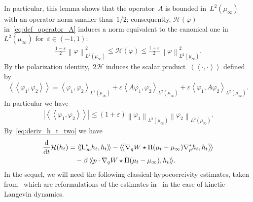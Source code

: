 \documentclass[onefignum,onetabnum]{siamart251216} %
\renewcommand{\d}{\mathrm{d}}
\newcommand{\norm}[1]{\left\lVert#1\right\rVert}
\newcommand{\mc}[1]{\mathcal{#1}}
\renewcommand{\leq}{\leqslant}
\newcommand{\mescin}{\mu}
\newcommand{\projp}{\Pi}
\newcommand{\adj}{\mathsf{L}_\infty^*}
\newcommand{\slangle}[1]{\left\langle #1 \right\rangle}
\newcommand{\dblangle}[1]{\left\langle\!\left\langle #1 \right\rangle\!\right\rangle}
\newcommand{\norml}[1]{\norm{#1}_{L^2(\mescin_\infty)}}
\newcommand{\scal}[1]{\slangle{#1}_{L^2(\mescin_\infty)}}
\newcommand{\eps}{\varepsilon}
\newcommand{\gp}[1]{\textcolor{blue}{\rm{[GP : #1]}}}
\theoremstyle{plain}
\numberwithin{equation}{section}
\numberwithin{theorem}{section}
\begin{document}
In particular, this lemma shows that the operator~$A$ is bounded in~$L^2(\mescin_\infty)$ with an operator norm smaller than~$1/2$; consequently, $\mc{H}(\varphi)$ in~\eqref{eq:def_operator_A} induces a norm equivalent to the canonical one in~$L^2(\mescin_\infty)$ for~$\eps \in (-1,1)$:
\begin{align}
    \label{eq:norm_eq}
    \frac{1-\eps}{2}\norml{\varphi}^2\leq \mc{H}(\varphi) \leq \frac{1+\eps}{2}\norml{\varphi}^2.
\end{align}
By the polarization identity,~$2\mc{H}$ induces the scalar product~$\dblangle{\cdot,\cdot}$ defined by
\begin{align}
    \label{eq:inner_prod_L2_hypo}
    \dblangle{\varphi_1,\varphi_2} = \scal{\varphi_1,\varphi_2} + \eps\scal{A\varphi_1,\varphi_2} + \eps\scal{\varphi_1,A\varphi_2}.
\end{align}
In particular we have
\begin{align}
    \label{eq:cauchy_schwarz}
    |\dblangle{\varphi_1,\varphi_2}| \leq (1+\eps)\norml{\varphi_1}\norml{\varphi_2}.
\end{align}
By~\eqref{eq:deriv_h_t_two} we have
\begin{align}
    \label{eq:deriv_H}
    \frac{\d}{\d t}\mc{H}(h_t)
    &= \dblangle{\adj h_t, h_t}
    - \dblangle{\nabla_q W \star \projp(\mescin_t - \mescin_\infty)\nabla_p^*h_t, h_t} \\
    \notag
    &\quad - \beta\dblangle{ p\cdot\nabla_q W \star \projp (\mescin_t - \mescin_\infty), h_t}\!.
\end{align}
In the sequel, we will need the following classical hypocoercivity estimates, taken from~\cite{roussel2018spectral} which are reformulations of the estimates in~\cite{dolbeault2009hypocoercivity,dolbeault2015hypocoercivity} in the case of kinetic Langevin dynamics.
\end{document}
